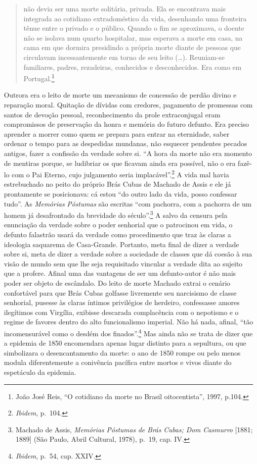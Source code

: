\begin{quote}
não devia ser uma morte solitária, privada. Ela se encontrava mais
integrada ao cotidiano extradoméstico da vida, desenhando uma fronteira
tênue entre o privado e o público. Quando o fim se aproximava, o doente
não se isolava num quarto hospitalar, mas esperava a morte em casa, na
cama em que dormira presidindo a própria morte diante de pessoas que
circulavam incessantemente em torno de seu leito (\dots{}). Reuniam-se
familiares, padres, rezadeiras, conhecidos e desconhecidos. Era como em
Portugal.\footnote{João José Reis, ``O cotidiano da morte no Brasil
  oitocentista'', 1997, p.104.}
\end{quote}

Outrora era o leito de morte um mecanismo de concessão de perdão divino
e reparação moral. Quitação de dívidas com credores, pagamento de
promessas com santos de devoção pessoal, reconhecimento da prole
extraconjugal eram compromissos de preservação da honra e memória do
futuro defunto. Era preciso aprender a morrer como quem se prepara para
entrar na eternidade, saber ordenar o tempo para as despedidas mundanas,
não esquecer pendentes pecados antigos, fazer a confissão da verdade
sobre si. ``A hora da morte não era momento de mentiras porque, se
ludibriar os que ficavam ainda era possível, não o era fazê-lo com o Pai
Eterno, cujo julgamento seria implacável''.\footnote{\textit{Ibidem},
  p.~104.} A vida mal havia estrebuchado no peito do próprio Brás Cubas
de Machado de Assis e ele já prontamente se posicionava: cá estou ``do
outro lado da vida, posso confessar tudo''. As \textit{Memórias Póstumas}
são escritas ``com pachorra, com a pachorra de um homem já desafrontado
da brevidade do século''.\footnote{Machado de Assis, \textit{Memórias
  Póstumas de Brás Cubas; Dom Casmurro} {[}1881; 1889{]} (São Paulo,
  Abril Cultural, 1978), p.~19, cap. IV.} A salvo da censura pela
enunciação da verdade sobre o poder senhorial que o patrocinou em vida,
o defunto falastrão usará da verdade como procedimento que traz às
claras a ideologia saquarema de Casa-Grande. Portanto, meta final de
dizer a verdade sobre si, meta de dizer a verdade sobre a sociedade de
classes que dá coesão à sua visão de mundo sem que lhe seja requisitado
vincular a verdade dita ao sujeito que a profere. Afinal uma das
vantagens de ser um defunto-autor é não mais poder ser objeto de
escândalo. Do leito de morte Machado extrai o cenário confortável para
que Brás Cubas golfasse livremente seu narcisismo de classe senhorial,
pusesse às claras íntimos privilégios de herdeiro, confessasse amores
ilegítimos com Virgília, exibisse descarada complacência com o nepotismo
e o regime de favores dentro do alto funcionalismo imperial. Não há
nada, afinal, ``tão incomensurável como o desdém dos
finados''.\footnote{\textit{Ibidem}, p.~54, cap. XXIV.} Mas ainda não se
trata de dizer que a epidemia de 1850 encomendara apenas lugar distinto
para a sepultura, ou que simbolizara o desencantamento da morte: o ano
de 1850 rompe ou pelo menos modula diferentemente a conivência pacífica
entre mortos e vivos diante do espetáculo da epidemia.

